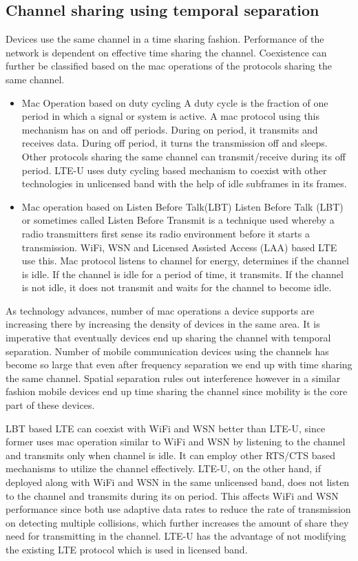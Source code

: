 \documentclass[a4paper]{article}
\begin{document}
\subsection{Channel sharing using temporal separation}
Devices use the same channel in a time sharing fashion. Performance of the network is dependent on effective time sharing the channel. 
 Coexistence can further be classified based on the mac operations of the protocols sharing the same channel.
\begin{itemize}
\item Mac Operation based on duty cycling
A duty cycle is the fraction of one period in which a signal or system is active. A mac protocol using this mechanism has on and off periods. During on period, it transmits and receives data. During off period, it turns the transmission off and sleeps. Other protocols sharing the same channel can transmit/receive during its off period. {LTE-U} uses duty cycling based mechanism to coexist with other technologies in unlicensed band with the help of idle subframes in its frames.

\item Mac operation based on Listen Before Talk({LBT})
Listen Before Talk (LBT) or sometimes called Listen Before Transmit is a technique used whereby a radio transmitters first sense its radio environment before it starts a transmission.
{WiFi, WSN and Licensed Assisted Access (LAA) based LTE use this}. Mac protocol listens to channel for energy, determines if the channel is idle. If the channel is idle for a period of time, it transmits. If the channel is not idle, it does not transmit and waits for the channel to become idle.
\end{itemize}
As technology advances, number of mac operations a device supports are increasing there by increasing the density of devices in the same area. It is imperative that eventually devices end up sharing the channel with temporal separation.  Number of mobile communication devices using the channels has become so large that even after frequency separation we end up with time sharing the same channel. Spatial separation rules out interference however in a similar fashion mobile devices end up time sharing the channel since mobility is the core part of these devices. \par
{LBT} based {LTE} can coexist with {WiFi} and {WSN} better than {LTE-U}, since former uses mac operation similar to {WiFi} and {WSN} by listening to the channel and transmits only when channel is idle. It can employ other {RTS/CTS} based mechanisms to utilize the channel effectively. {LTE-U}, on the other hand, if deployed along with {WiFi} and {WSN} in the same unlicensed band, does not listen to the channel and transmits during its on period. This affects {WiFi} and {WSN} performance since both use adaptive data rates to reduce the rate of transmission on detecting multiple collisions, which further increases the amount of share they need for transmitting in the channel. {LTE-U} has the advantage of not modifying the existing {LTE} protocol which is used in licensed band.
\end{document}

